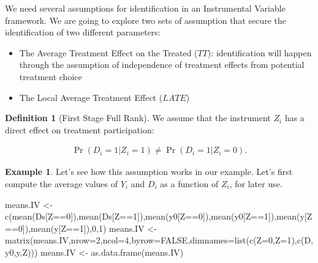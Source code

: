 \documentclass[
]{book}
\newenvironment{Shaded}{\begin{snugshade}}{\end{snugshade}}
\newcommand{\AttributeTok}[1]{\textcolor[rgb]{0.77,0.63,0.00}{#1}}
\newcommand{\ConstantTok}[1]{\textcolor[rgb]{0.00,0.00,0.00}{#1}}
\newcommand{\DecValTok}[1]{\textcolor[rgb]{0.00,0.00,0.81}{#1}}
\newcommand{\FunctionTok}[1]{\textcolor[rgb]{0.00,0.00,0.00}{#1}}
\newcommand{\NormalTok}[1]{#1}
\newcommand{\OtherTok}[1]{\textcolor[rgb]{0.56,0.35,0.01}{#1}}
\newcommand{\SpecialCharTok}[1]{\textcolor[rgb]{0.00,0.00,0.00}{#1}}
\newcommand{\StringTok}[1]{\textcolor[rgb]{0.31,0.60,0.02}{#1}}
\providecommand{\tightlist}{%
  \setlength{\itemsep}{0pt}\setlength{\parskip}{0pt}}
\theoremstyle{definition}
\newtheorem{definition}{Definition}[chapter]
\theoremstyle{definition}
\newtheorem{example}{Example}[chapter]
\theoremstyle{definition}
\theoremstyle{definition}
\theoremstyle{remark}
\begin{document}
We need several assumptions for identification in an Instrumental Variable framework.
We are going to explore two sets of assumption that secure the identification of two different parameters:

\begin{itemize}
\tightlist
\item
  The Average Treatment Effect on the Treated (\(TT\)): identification will happen through the assumption of independence of treatment effects from potential treatment choice
\item
  The Local Average Treatment Effect (\(LATE\))
\end{itemize}

\begin{definition}[First Stage Full Rank]
\protect\hypertarget{def:FirstStage}{}{\label{def:FirstStage} \iffalse (First Stage Full Rank) \fi{} }We assume that the instrument \(Z_i\) has a direct effect on treatment participation:

\begin{align*}
\Pr(D_i=1|Z_i=1)\neq\Pr(D_i=1|Z_i=0).
\end{align*}
\end{definition}

\begin{example}
\protect\hypertarget{exm:unnamed-chunk-140}{}{\label{exm:unnamed-chunk-140} }Let's see how this assumption works in our example.
Let's first compute the average values of \(Y_i\) and \(D_i\) as a function of \(Z_i\), for later use.
\end{example}

\begin{Shaded}
\begin{Highlighting}[]
\NormalTok{means.IV }\OtherTok{\textless{}{-}} \FunctionTok{c}\NormalTok{(}\FunctionTok{mean}\NormalTok{(Ds[Z}\SpecialCharTok{==}\DecValTok{0}\NormalTok{]),}\FunctionTok{mean}\NormalTok{(Ds[Z}\SpecialCharTok{==}\DecValTok{1}\NormalTok{]),}\FunctionTok{mean}\NormalTok{(y0[Z}\SpecialCharTok{==}\DecValTok{0}\NormalTok{]),}\FunctionTok{mean}\NormalTok{(y0[Z}\SpecialCharTok{==}\DecValTok{1}\NormalTok{]),}\FunctionTok{mean}\NormalTok{(y[Z}\SpecialCharTok{==}\DecValTok{0}\NormalTok{]),}\FunctionTok{mean}\NormalTok{(y[Z}\SpecialCharTok{==}\DecValTok{1}\NormalTok{]),}\DecValTok{0}\NormalTok{,}\DecValTok{1}\NormalTok{)}
\NormalTok{means.IV }\OtherTok{\textless{}{-}} \FunctionTok{matrix}\NormalTok{(means.IV,}\AttributeTok{nrow=}\DecValTok{2}\NormalTok{,}\AttributeTok{ncol=}\DecValTok{4}\NormalTok{,}\AttributeTok{byrow=}\ConstantTok{FALSE}\NormalTok{,}\AttributeTok{dimnames=}\FunctionTok{list}\NormalTok{(}\FunctionTok{c}\NormalTok{(}\StringTok{\textquotesingle{}Z=0\textquotesingle{}}\NormalTok{,}\StringTok{\textquotesingle{}Z=1\textquotesingle{}}\NormalTok{),}\FunctionTok{c}\NormalTok{(}\StringTok{\textquotesingle{}D\textquotesingle{}}\NormalTok{,}\StringTok{\textquotesingle{}y0\textquotesingle{}}\NormalTok{,}\StringTok{\textquotesingle{}y\textquotesingle{}}\NormalTok{,}\StringTok{\textquotesingle{}Z\textquotesingle{}}\NormalTok{)))}
\NormalTok{means.IV }\OtherTok{\textless{}{-}} \FunctionTok{as.data.frame}\NormalTok{(means.IV)}
\end{Highlighting}
\end{Shaded}
\end{document}
